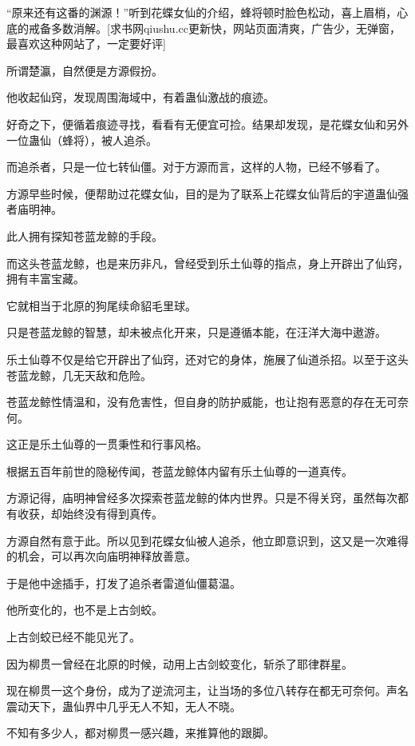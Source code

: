 
\begin{this_body}

“原来还有这番的渊源！”听到花蝶女仙的介绍，蜂将顿时脸色松动，喜上眉梢，心底的戒备多数消解。[求书网qiushu.cc更新快，网站页面清爽，广告少，无弹窗，最喜欢这种网站了，一定要好评]

所谓楚瀛，自然便是方源假扮。

他收起仙窍，发现周围海域中，有着蛊仙激战的痕迹。

好奇之下，便循着痕迹寻找，看看有无便宜可捡。结果却发现，是花蝶女仙和另外一位蛊仙（蜂将），被人追杀。

而追杀者，只是一位七转仙僵。对于方源而言，这样的人物，已经不够看了。

方源早些时候，便帮助过花蝶女仙，目的是为了联系上花蝶女仙背后的宇道蛊仙强者庙明神。

此人拥有探知苍蓝龙鲸的手段。

而这头苍蓝龙鲸，也是来历非凡，曾经受到乐土仙尊的指点，身上开辟出了仙窍，拥有丰富宝藏。

它就相当于北原的狗尾续命貂毛里球。

只是苍蓝龙鲸的智慧，却未被点化开来，只是遵循本能，在汪洋大海中遨游。

乐土仙尊不仅是给它开辟出了仙窍，还对它的身体，施展了仙道杀招。以至于这头苍蓝龙鲸，几无天敌和危险。

苍蓝龙鲸性情温和，没有危害性，但自身的防护威能，也让抱有恶意的存在无可奈何。

这正是乐土仙尊的一贯秉性和行事风格。

根据五百年前世的隐秘传闻，苍蓝龙鲸体内留有乐土仙尊的一道真传。

方源记得，庙明神曾经多次探索苍蓝龙鲸的体内世界。只是不得关窍，虽然每次都有收获，却始终没有得到真传。

方源自然有意于此。所以见到花蝶女仙被人追杀，他立即意识到，这又是一次难得的机会，可以再次向庙明神释放善意。

于是他中途插手，打发了追杀者雷道仙僵葛温。

他所变化的，也不是上古剑蛟。

上古剑蛟已经不能见光了。

因为柳贯一曾经在北原的时候，动用上古剑蛟变化，斩杀了耶律群星。

现在柳贯一这个身份，成为了逆流河主，让当场的多位八转存在都无可奈何。声名震动天下，蛊仙界中几乎无人不知，无人不晓。

不知有多少人，都对柳贯一感兴趣，来推算他的跟脚。


\end{this_body}
